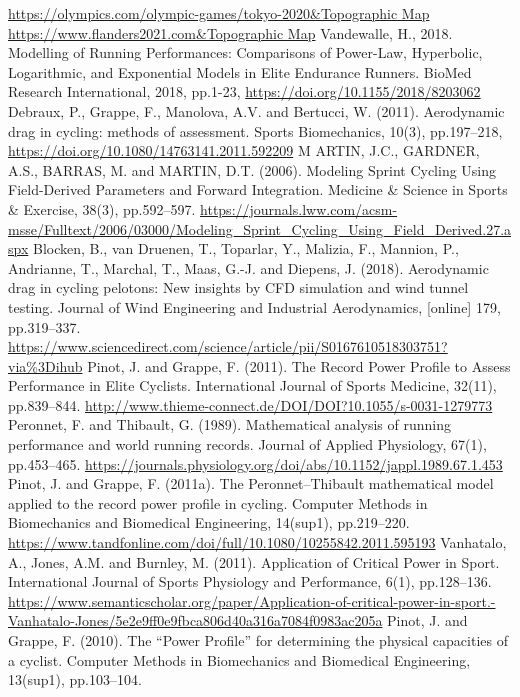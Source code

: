 \documentclass{mcmthesis}
\begin{document}
\begin{thebibliography}{99}
	\url{https://olympics.com/olympic-games/tokyo-2020&Topographic Map}
	\url{https://www.flanders2021.com&Topographic Map}
	 Vandewalle, H., 2018. Modelling of Running Performances: Comparisons of Power-Law, Hyperbolic, Logarithmic, and Exponential Models in Elite Endurance Runners. BioMed Research International, 2018, pp.1-23, \url{https://doi.org/10.1155/2018/8203062}
	 Debraux, P., Grappe, F., Manolova, A.V. and Bertucci, W. (2011). Aerodynamic drag in cycling: methods of assessment. Sports Biomechanics, 10(3), pp.197–218, \url{https://doi.org/10.1080/14763141.2011.592209}
	M ARTIN, J.C., GARDNER, A.S., BARRAS, M. and MARTIN, D.T. (2006). Modeling Sprint Cycling Using Field-Derived Parameters and Forward Integration. Medicine \& Science in Sports \& Exercise, 38(3), pp.592–597.
	\url{https://journals.lww.com/acsm-msse/Fulltext/2006/03000/Modeling_Sprint_Cycling_Using_Field_Derived.27.aspx}
	Blocken, B., van Druenen, T., Toparlar, Y., Malizia, F., Mannion, P., Andrianne, T., Marchal, T., Maas, G.-J. and Diepens, J. (2018). Aerodynamic drag in cycling pelotons: New insights by CFD simulation and wind tunnel testing. Journal of Wind Engineering and Industrial Aerodynamics, [online] 179, pp.319–337. 
	\url{https://www.sciencedirect.com/science/article/pii/S0167610518303751?via%3Dihub}
	Pinot, J. and Grappe, F. (2011). The Record Power Profile to Assess Performance in Elite Cyclists. International Journal of Sports Medicine, 32(11), pp.839–844.
	\url{http://www.thieme-connect.de/DOI/DOI?10.1055/s-0031-1279773}
	Peronnet, F. and Thibault, G. (1989). Mathematical analysis of running performance and world running records. Journal of Applied Physiology, 67(1), pp.453–465.
	\url{https://journals.physiology.org/doi/abs/10.1152/jappl.1989.67.1.453}
	Pinot, J. and Grappe, F. (2011a). The Peronnet–Thibault mathematical model applied to the record power profile in cycling. Computer Methods in Biomechanics and Biomedical Engineering, 14(sup1), pp.219–220.
	\url{https://www.tandfonline.com/doi/full/10.1080/10255842.2011.595193}
	Vanhatalo, A., Jones, A.M. and Burnley, M. (2011). Application of Critical Power in Sport. International Journal of Sports Physiology and Performance, 6(1), pp.128–136.
	\url{https://www.semanticscholar.org/paper/Application-of-critical-power-in-sport.-Vanhatalo-Jones/5e2e9ff0e9fbca806d40a316a7084f0983ac205a}
	Pinot, J. and Grappe, F. (2010). The “Power Profile” for determining the physical capacities of a cyclist. Computer Methods in Biomechanics and Biomedical Engineering, 13(sup1), pp.103–104.

\end{thebibliography}
\end{document}
